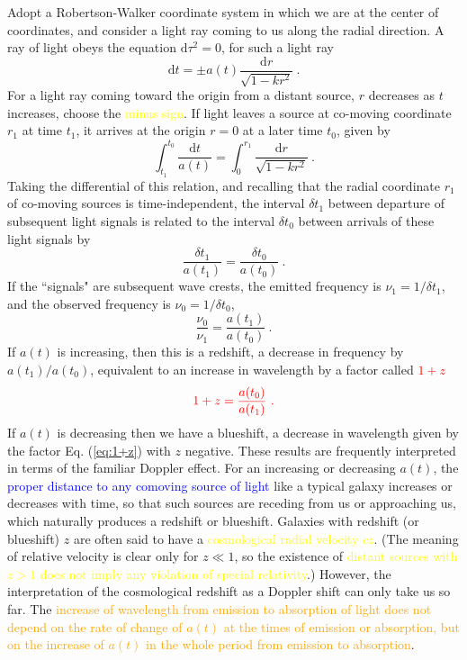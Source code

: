 \documentclass[12pt,a4paper]{article}
\newcommand{\dif}{\mathrm{d}}
\begin{document}
\cite{2008cosm.book.....W} Adopt a Robertson-Walker coordinate system in which we are at the center of coordinates, and consider a light ray coming to us along the radial direction. A ray of light obeys the equation $\dif \tau^2 = 0$, for such a light ray 
\begin{equation}
\dif t = \pm a(t) \dfrac{\dif r}{\sqrt{1-kr^2}} ~.
\end{equation}
For a light ray coming toward the origin from a distant source, $r$ decreases as $t$ increases, choose the \textcolor{yellow}{minus sign}. If light leaves a source at co-moving coordinate $r_1$ at time $t_1$, it arrives at the origin $r = 0$ at a later time $t_0$, given by
\begin{equation}
\int_{t_1}^{t_0} \dfrac{\dif t}{a(t) } = \int_0^{r_1} \dfrac{\dif r}{\sqrt{1-kr^2}} ~.
\end{equation}
Taking the differential of this relation, and recalling that the radial coordinate $r_1$ of co-moving sources is time-independent, the interval $\delta {t_1}$ between departure of subsequent light signals is related to the interval $\delta {t_0}$ between arrivals of these light signals by
\begin{equation}
\dfrac{\delta t_1}{a(t_1)} = \dfrac{\delta t_0}{a(t_0)} ~.
\end{equation}
If the ``signals" are subsequent wave crests, the emitted frequency is $\nu_1 = 1/\delta t_1$, and the observed frequency is $\nu_0 = 1/\delta t_0$, 
\begin{equation}
\dfrac{\nu_0}{\nu_1} = \dfrac{a(t_1)}{a(t_0)} ~.
\end{equation}
If $a(t)$ is increasing, then this is a redshift, a decrease in frequency by $a(t_1)/a(t_0)$, equivalent to an increase in wavelength by a factor called \textcolor{red}{$1 + z$}
\begin{equation}
\color{red} 1+z = \dfrac{a(t_0)}{a(t_1)} ~.
\label{eq:1+z}
\end{equation}
If $a(t)$ is decreasing then we have a blueshift, a decrease in wavelength given by the factor Eq. (\ref{eq:1+z}) with $z$ negative. These results are frequently interpreted in terms of the familiar Doppler effect. For an increasing or decreasing $a(t)$, the \textcolor{blue}{proper distance to any comoving source of light} like a typical galaxy increases or decreases with time, so that such sources are receding from us or approaching us, which naturally produces a redshift or blueshift. Galaxies with redshift (or blueshift) $z$ are often said to have a \textcolor{yellow}{cosmological radial velocity $cz$}. (The meaning of relative velocity is clear only for $z \ll 1$, so the existence of \textcolor{yellow}{distant sources with $z > 1$ does not imply any violation of special relativity}.) However, the interpretation of the cosmological redshift as a Doppler shift  can only take us so far. The \textcolor{orange}{increase of wavelength from emission to absorption of light does not depend on the rate of change of $a(t)$ at the times of emission or absorption, but on the increase of $a(t)$ in the whole period from emission to absorption}. 
\end{document}
